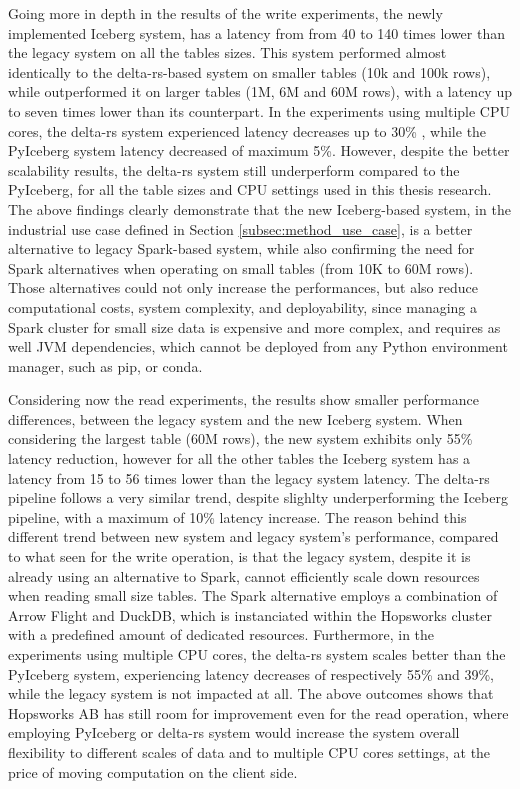 Going more in depth in the results of the write experiments, the newly implemented Iceberg system, has a latency from from 40 to 140 times lower than the legacy system on all the tables sizes. This system performed almost identically to the delta-rs-based system on smaller tables (10k and 100k rows), while outperformed it on larger tables (1M, 6M and 60M rows), with a latency up to seven times lower than its counterpart. In the experiments using multiple \gls{CPU} cores, the delta-rs system experienced latency decreases up to 30\% , while the PyIceberg system latency decreased of maximum 5\%. However, despite the better scalability results, the delta-rs system still underperform compared to the PyIceberg, for all the table sizes and \gls{CPU} settings used in this thesis research. The above findings clearly demonstrate that the new Iceberg-based system, in the industrial use case defined in Section \ref{subsec:method_use_case}, is a better alternative to legacy Spark-based system, while also confirming the need for Spark alternatives when operating on small tables (from 10K to 60M rows). Those alternatives could not only increase the performances, but also reduce computational costs, system complexity, and deployability, since managing a Spark cluster for small size data is expensive and more complex, and requires as well \gls{JVM} dependencies, which cannot be deployed from any Python environment manager, such as pip, or conda.

Considering now the read experiments, the results show smaller performance differences, between the legacy system and the new Iceberg system. When considering the largest table (60M rows), the new system exhibits only 55\% latency reduction, however for all the other tables the Iceberg system has a latency from 15 to 56 times lower than the legacy system latency. The delta-rs pipeline follows a very similar trend, despite slighlty underperforming the Iceberg pipeline, with a maximum of 10\% latency increase. The reason behind this different trend between new system and legacy system's performance, compared to what seen for the write operation, is that the legacy system, despite it is already using an alternative to Spark, cannot efficiently scale down resources when reading small size tables. The Spark alternative employs a combination of Arrow Flight and DuckDB, which is instanciated within the Hopsworks cluster with a predefined amount of dedicated resources. Furthermore, in the experiments using multiple \gls{CPU} cores, the delta-rs system scales better than the PyIceberg system, experiencing latency decreases of respectively 55\% and 39\%, while the legacy system is not impacted at all. The above outcomes shows that Hopsworks AB has still room for improvement even for the read operation, where employing PyIceberg or delta-rs system would increase the system overall flexibility to different scales of data and to multiple \gls{CPU} cores settings, at the price of moving computation on the client side.

